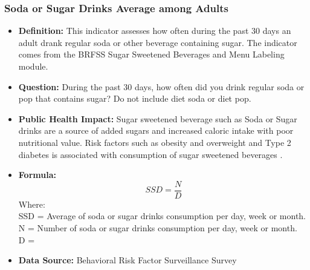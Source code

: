 \documentclass[12pt,letterpaper]{report}
\begin{document}
		\subsubsection{Soda or Sugar Drinks Average among Adults} 
	\begin{itemize}
		\item \textbf{Definition:} This indicator assesses how often during the past 30 days an adult drank regular soda or other beverage containing sugar. The indicator comes from the BRFSS Sugar Sweetened Beverages and Menu Labeling module.  		
		\item \textbf{Question:} During the past 30 days, how often did you drink regular soda or pop that contains sugar? Do not include diet soda or diet pop.
		\item \textbf{Public Health Impact:} Sugar sweetened beverage such as Soda or Sugar drinks are a source of added sugars and increased caloric intake with poor nutritional value. Risk factors such as obesity and overweight and Type 2 diabetes is associated with consumption of sugar sweetened beverages \cite{vartanian2007effects}. 
		
		\item \textbf{Formula:} 
			\begin{equation}
			SSD = \frac{N}{D}
			\end{equation}
Where: \\
			SSD = Average of soda or sugar drinks consumption per day, week or month.\\
			
			N = Number of soda or sugar drinks consumption per day, week or month.\\
			
			D = \\
			
		\item \textbf{Data Source:} Behavioral Risk Factor Surveillance Survey
	\end{itemize}

\end{document}
